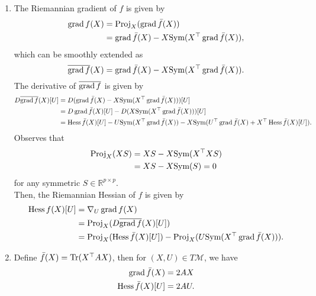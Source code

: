 \documentclass[en, oneside]{assignment}
\begin{document}
\begin{sol}
    \begin{enumerate}[label=(\arabic*)]
        \item The Riemannian gradient of $f$ is given by
        \begin{align*}
            \operatorname{grad} f(X) &= \operatorname{Proj}_X(\operatorname{grad} \bar{f}(X))\\
            &= \operatorname{grad} \bar{f}(X) - X \text{Sym}(X^\top \operatorname{grad} \bar{f}(X)),
        \end{align*}
        which can be smoothly extended as
        \begin{equation*}
            \overline{\operatorname{grad} f}(X) = \operatorname{grad} \bar{f}(X) - X \text{Sym}(X^\top \operatorname{grad} \bar{f}(X)).
        \end{equation*}
        The derivative of $\overline{\operatorname{grad} f}$ is given by
        \begin{align*}
            D \overline{\operatorname{grad} f}(X)[U] &= D (\operatorname{grad} \bar{f}(X) - X \text{Sym}(X^\top \operatorname{grad} \bar{f}(X)))[U]\\
            &= D \operatorname{grad} \bar{f}(X)[U] - D(X \text{Sym}(X^\top \operatorname{grad} \bar{f}(X)))[U]\\
            &= \operatorname{Hess} \bar{f}(X)[U] - U \text{Sym}(X^\top \operatorname{grad} \bar{f}(X)) - X \text{Sym}(U^\top \operatorname{grad} \bar{f}(X) + X^\top \operatorname{Hess} \bar{f}(X)[U]).
        \end{align*}
        Observes that
        \begin{align*}
            \operatorname{Proj}_X(X S) &= X S - X \text{Sym}(X^\top X S)\\
            &= X S - X \text{Sym}(S) = 0
        \end{align*}
        for any symmetric $S \in \mathbb{R}^{p \times p}$.\\
        Then, the Riemannian Hessian of $f$ is given by
        \begin{align*}
            \operatorname{Hess} f(X)[U] &= \nabla_U \operatorname{grad} f(X)\\
            &= \operatorname{Proj}_X(D \overline{\operatorname{grad} f}(X)[U])\\
            &= \operatorname{Proj}_X(\operatorname{Hess} \bar{f}(X)[U]) - \operatorname{Proj}_X(U \text{Sym}(X^\top \operatorname{grad} \bar{f}(X))).
        \end{align*}
        \item Define $\bar{f}(X) = \operatorname{Tr}(X^\top A X)$, then for $(X, U) \in T\mathcal{M}$, we have
        \begin{align*}
            \operatorname{grad} \bar f (X) &= 2 A X\\
            \operatorname{Hess} \bar f (X)[U] &= 2 A U.
        \end{align*}

\end{enumerate}
\end{sol}
\end{document}
